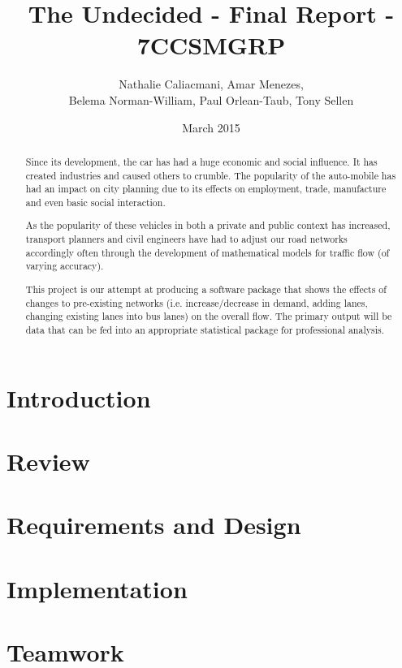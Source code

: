 \documentclass[titlepage]{article}
\title{The Undecided - Final Report - 7CCSMGRP}
\author{Nathalie Caliacmani, Amar Menezes, \\ Belema Norman-William, Paul Orlean-Taub, Tony Sellen}
\date{March 2015}
\begin{document}

\maketitle

\begin{abstract}
Since its development, the car has had a huge economic and social influence. It has created industries and caused others to crumble. The popularity of the auto-mobile has had an impact on city planning due to its effects on employment, trade, manufacture and even basic social interaction.

As the popularity of these vehicles in both a private and public context has increased, transport planners and civil engineers have had to adjust our road networks accordingly often through the development of mathematical models for traffic flow (of varying accuracy).

This project is our attempt at producing a software  package that shows the effects of changes to pre-existing networks (i.e. increase/decrease in demand, adding lanes, changing existing lanes into bus lanes) on the overall flow. The primary output will be data that can be fed into an appropriate statistical package for professional analysis.
\end{abstract}

\tableofcontents
\newpage

\section{Introduction}
	

\section{Review}
	
	
\section{Requirements and Design}
	
\section{Implementation}
	
\section{Teamwork}
	
\end{document}
